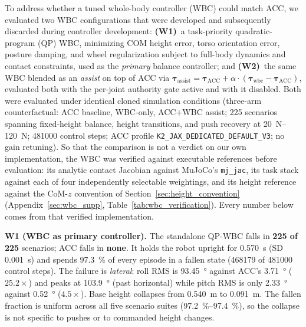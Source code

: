 \documentclass[a4paper,fleqn]{cas-dc}
\begin{document}
To address whether a tuned whole-body controller (WBC) could match ACC, we evaluated two WBC configurations that were developed and subsequently discarded during controller development:
\textbf{(W1)}~a task-priority quadratic-program (QP) WBC, minimizing COM height error, torso orientation error, posture damping, and wheel regularization subject to full-body dynamics and contact constraints, used as the \emph{primary} balance controller; and
\textbf{(W2)}~the same WBC blended as an \emph{assist} on top of ACC via $\boldsymbol{\tau}_{\text{assist}} = \boldsymbol{\tau}_{\text{ACC}} + \alpha\!\cdot\!(\boldsymbol{\tau}_{\text{wbc}} - \boldsymbol{\tau}_{\text{ACC}})$, evaluated both with the per-joint authority gate active and with it disabled.
Both were evaluated under identical cloned simulation conditions (three-arm counterfactual: ACC baseline, WBC-only, ACC$+$WBC assist; 225 scenarios spanning fixed-height balance, height transitions, and push recovery at \SIrange{20}{120}{N}; \num{481000} control steps; ACC profile \texttt{K2\_JAX\_DEDICATED\_DEFAULT\_V3}; no gain retuning).
So that the comparison is not a verdict on our own implementation, the WBC was verified against executable references before evaluation: its analytic contact Jacobian against MuJoCo's \texttt{mj\_jac}, its task stack against each of four independently selectable weightings, and its height reference against the CoM-$z$ convention of Section~\ref{sec:height_convention} (Appendix~\ref{sec:wbc_supp}, Table~\ref{tab:wbc_verification}). Every number below comes from that verified implementation.

\medskip\noindent\textbf{W1 (WBC as primary controller).}
The standalone QP-WBC falls in \textbf{225 of 225} scenarios; ACC falls in \textbf{none}.
It holds the robot upright for \SI{0.570}{s} (SD \SI{0.001}{s}) and spends \SI{97.3}{\percent} of every episode in a fallen state (\num{468179} of \num{481000} control steps).
The failure is \emph{lateral}: roll RMS is \SI{93.45}{\degree} against ACC's \SI{3.71}{\degree} ($\num{25.2}\times$) and peaks at \SI{103.9}{\degree} (past horizontal) while pitch RMS is only \SI{2.33}{\degree} against \SI{0.52}{\degree} ($\num{4.5}\times$).
Base height collapses from \SI{0.540}{m} to \SI{0.091}{m}.
The fallen fraction is uniform across all five scenario suites (\SIrange{97.2}{97.4}{\percent}), so the collapse is not specific to pushes or to commanded height changes.
\end{document}
